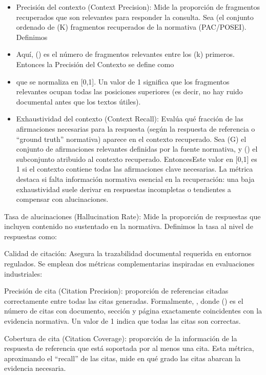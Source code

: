 \begin{itemize}\item Precisión del contexto (Context Precision): Mide la proporción de fragmentos recuperados que son relevantes para responder la consulta. Sea (el conjunto ordenado de (K) fragmentos recuperados de la normativa (PAC/POSEI). Definimos\end{itemize}
\begin{itemize}\item Aquí, () es el número de fragmentos relevantes entre los (k) primeros. Entonces la Precisión del Contexto se define como\end{itemize}
\begin{itemize}\item que se normaliza en [0,1]. Un valor de 1 significa que los fragmentos relevantes ocupan todas las posiciones superiores (es decir, no hay ruido documental antes que los textos útiles).\end{itemize}
\begin{itemize}\item Exhaustividad del contexto (Context Recall): Evalúa qué fracción de las afirmaciones necesarias para la respuesta (según la respuesta de referencia o ``ground truth'' normativa) aparece en el contexto recuperado. Sea (G) el conjunto de afirmaciones relevantes definidas por la fuente normativa, y () el subconjunto atribuido al contexto recuperado. EntoncesEste valor en [0,1] es 1 si el contexto contiene todas las afirmaciones clave necesarias. La métrica destaca si falta información normativa esencial en la recuperación: una baja exhaustividad suele derivar en respuestas incompletas o tendientes a compensar con alucinaciones.\end{itemize}
Tasa de alucinaciones (Hallucination Rate): Mide la proporción de respuestas que incluyen contenido no sustentado en la normativa. Definimos la tasa al nivel de respuestas como:

Calidad de citación: Asegura la trazabilidad documental requerida en entornos regulados. Se emplean dos métricas complementarias inspiradas en evaluaciones industriales:

Precisión de cita (Citation Precision): proporción de referencias citadas correctamente entre todas las citas generadas. Formalmente, , donde () es el número de citas con documento, sección y página exactamente coincidentes con la evidencia normativa. Un valor de 1 indica que todas las citas son correctas.

Cobertura de cita (Citation Coverage): proporción de la información de la respuesta de referencia que está soportada por al menos una cita. Esta métrica, aproximando el ``recall'' de las citas, mide en qué grado las citas abarcan la evidencia necesaria.



